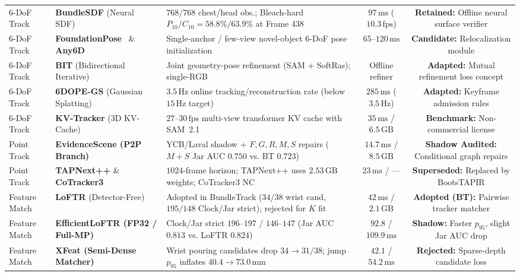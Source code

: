 \documentclass[10pt,journal]{IEEEtran}
\begin{document}
\begin{table}[t]
{\begin{tabular}{@{}llp{6.6cm}cc@{}}
        6-DoF Track & \textbf{BundleSDF} (Neural SDF)~\cite{bundlesdf} & $768/768$ chest/head obs.; Bleach-hard $P_{10}/C_{10}=58.8\%/63.9\%$ at Frame 438 & $97\,\mathrm{ms}$ ($10.3\,\mathrm{fps}$) & \textbf{Retained:} Offline neural surface verifier \\
        6-DoF Track & \textbf{FoundationPose}~\cite{foundationpose} \& \textbf{Any6D} & Single-anchor / few-view novel-object 6-DoF pose initialization & $65$--$120\,\mathrm{ms}$ & \textbf{Candidate:} Relocalization module \\
        6-DoF Track & \textbf{BIT} (Bidirectional Iterative) & Joint geometry-pose refinement (SAM + SoftRas); single-RGB & Offline refiner & \textbf{Adapted:} Mutual refinement loss concept \\
        6-DoF Track & \textbf{6DOPE-GS} (Gaussian Splatting) & $3.5\,\mathrm{Hz}$ online tracking/reconstruction rate (below $15\,\mathrm{Hz}$ target) & $285\,\mathrm{ms}$ ($3.5\,\mathrm{Hz}$) & \textbf{Adapted:} Keyframe admission rules \\
        6-DoF Track & \textbf{KV-Tracker} (3D KV-Cache) & $27$--$30\,\mathrm{fps}$ multi-view transformer KV cache with SAM~2.1 & $35\,\mathrm{ms}$ / $6.5\,\mathrm{GB}$ & \textbf{Benchmark:} Non-commercial license \\
        Point Track & \textbf{EvidenceScene (P2P Branch)}~\cite{point2pose,bootstap} & YCB/Laval shadow + $F,G,R,M,S$ repairs ($M+S$ Jar AUC $0.750$ vs. BT $0.723$) & $14.7\,\mathrm{ms}$ / $8.5\,\mathrm{GB}$ & \textbf{Shadow Audited:} Conditional graph repairs \\
        Point Track & \textbf{TAPNext++} \& \textbf{CoTracker3} & $1024$-frame horizon; TAPNext++ uses $2.53\,\mathrm{GB}$ weights; CoTracker3 NC & $23\,\mathrm{ms}$ / --- & \textbf{Superseded:} Replaced by BootsTAPIR \\
        Feature Match & \textbf{LoFTR} (Detector-Free)~\cite{loftr} & Adopted in BundleTrack ($34/38$ wrist cand, $195/148$ Clock/Jar strict); rejected for $K$ fit & $42\,\mathrm{ms}$ / $2.1\,\mathrm{GB}$ & \textbf{Adopted (BT):} Pairwise tracker matcher \\
        Feature Match & \textbf{EfficientLoFTR (FP32 / Full-MP)}~\cite{eloftr} & Clock/Jar strict $196$--$197$ / $146$--$147$ (Jar AUC $0.813$ vs. LoFTR $0.824$) & $92.8$ / $109.9\,\mathrm{ms}$ & \textbf{Shadow:} Faster $p_{95}$, slight Jar AUC drop \\
        Feature Match & \textbf{XFeat (Semi-Dense Matcher)}~\cite{xfeat} & Wrist pouring candidates drop $34 \to 31/38$; jump $p_{95}$ inflates $40.4 \to 73.0\,\mathrm{mm}$ & $42.1$ / $54.2\,\mathrm{ms}$ & \textbf{Rejected:} Sparse-depth candidate loss \\

\end{tabular}}
\end{table}
\end{document}
